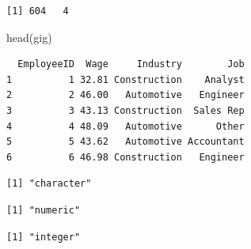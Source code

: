 \documentclass[
  letterpaper,
  DIV=11,
  numbers=noendperiod]{scrreprt}
\newenvironment{Shaded}{\begin{snugshade}}{\end{snugshade}}
\newcommand{\CommentTok}[1]{\textcolor[rgb]{0.37,0.37,0.37}{#1}}
\newcommand{\DocumentationTok}[1]{\textcolor[rgb]{0.37,0.37,0.37}{\textit{#1}}}
\newcommand{\FunctionTok}[1]{\textcolor[rgb]{0.28,0.35,0.67}{#1}}
\newcommand{\NormalTok}[1]{\textcolor[rgb]{0.00,0.23,0.31}{#1}}
\newcommand{\SpecialCharTok}[1]{\textcolor[rgb]{0.37,0.37,0.37}{#1}}
\begin{document}
\begin{verbatim}
[1] 604   4
\end{verbatim}

\begin{Shaded}
\begin{Highlighting}[]
\FunctionTok{head}\NormalTok{(gig)}
\end{Highlighting}
\end{Shaded}

\begin{verbatim}
  EmployeeID  Wage     Industry        Job
1          1 32.81 Construction    Analyst
2          2 46.00   Automotive   Engineer
3          3 43.13 Construction  Sales Rep
4          4 48.09   Automotive      Other
5          5 43.62   Automotive Accountant
6          6 46.98 Construction   Engineer
\end{verbatim}

\begin{Shaded}
\end{Shaded}

\begin{verbatim}
[1] "character"
\end{verbatim}

\begin{Shaded}
\end{Shaded}

\begin{verbatim}
[1] "numeric"
\end{verbatim}

\begin{Shaded}
\end{Shaded}

\begin{verbatim}
[1] "integer"
\end{verbatim}
\end{document}
